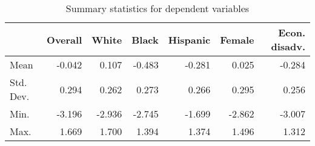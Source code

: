 \begin{table}

\caption{\label{tab:SumStats}Summary statistics for dependent variables}
\centering
\begin{tabular}[t]{lrrrrrr}
\toprule
  & Overall & White & Black & Hispanic & Female & Econ. disadv.\\
\midrule
Mean & -0.042 & 0.107 & -0.483 & -0.281 & 0.025 & -0.284\\
Std. Dev. & 0.294 & 0.262 & 0.273 & 0.266 & 0.295 & 0.256\\
Min. & -3.196 & -2.936 & -2.745 & -1.699 & -2.862 & -3.007\\
Max. & 1.669 & 1.700 & 1.394 & 1.374 & 1.496 & 1.312\\
\bottomrule
\end{tabular}
\end{table}
